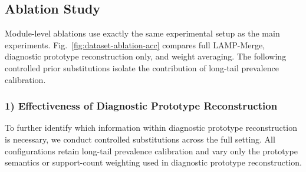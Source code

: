 \documentclass[letterpaper]{article} %
\begin{document}
\subsection{Ablation Study}

Module-level ablations use exactly the same experimental setup as the main experiments. Fig.~\ref{fig:dataset-ablation-acc} compares full LAMP-Merge, diagnostic prototype reconstruction only, and weight averaging. The following controlled prior substitutions isolate the contribution of long-tail prevalence calibration.

\subsubsection{1) Effectiveness of Diagnostic Prototype Reconstruction}
To further identify which information within diagnostic prototype reconstruction is necessary, we conduct controlled substitutions across the full setting. All configurations retain long-tail prevalence calibration and vary only the prototype semantics or support-count weighting used in diagnostic prototype reconstruction.
\end{document}

